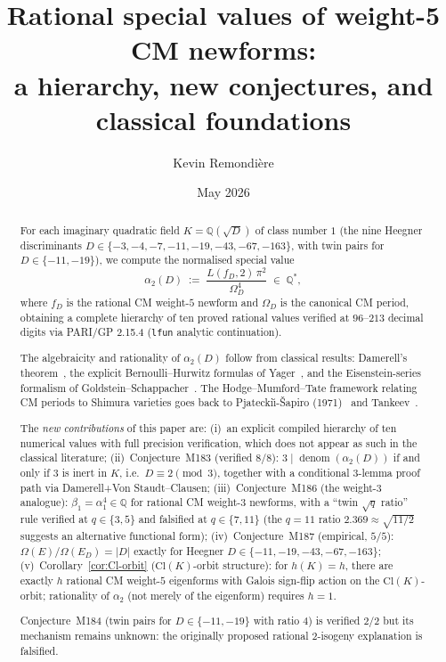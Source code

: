 \documentclass[12pt]{amsart}
\title{Rational special values of weight-5 CM newforms:\\
       a hierarchy, new conjectures, and classical foundations}
\author{Kevin Remondière}
\date{May 2026}
\theoremstyle{definition}
\DeclareMathOperator{\denom}{denom}
\newcommand{\Q}{\mathbb{Q}}
\newcommand{\Omega}{\varOmega}
\begin{document}
\begin{abstract}
For each imaginary quadratic field $K = \Q(\sqrt{D})$ of class number $1$
(the nine Heegner discriminants $D \in \{-3,-4,-7,-11,-19,-43,-67,-163\}$,
with twin pairs for $D \in \{-11,-19\}$),
we compute the normalised special value
\[
  \alpha_2(D) \;:=\; \frac{L(f_D,2)\,\pi^2}{\Omega_D^4} \;\in\; \Q^*,
\]
where $f_D$ is the rational CM weight-$5$ newform and $\Omega_D$ is the
canonical CM period, obtaining a complete hierarchy of ten proved rational
values verified at $96$--$213$ decimal digits via PARI/GP 2.15.4
(\texttt{lfun} analytic continuation).

The algebraicity and rationality of $\alpha_2(D)$ follow from classical results:
Damerell's theorem~\cite{Damerell1971}, the explicit Bernoulli--Hurwitz
formulas of Yager~\cite{Yager1982}, and the Eisenstein-series formalism of
Goldstein--Schappacher~\cite{GoldsteinSchappacher1981}.
The Hodge--Mumford--Tate framework relating CM periods to Shimura varieties
goes back to Pjatecki\u{\i}-\v{S}apiro (1971)~\cite{CITE-NEEDED-PS1971} and
Tankeev~\cite{CITE-NEEDED-Tankeev1990}.

The \emph{new contributions} of this paper are:
(i)~an explicit compiled hierarchy of ten numerical values with full precision
verification, which does not appear as such in the classical literature;
(ii)~Conjecture~M183 (verified $8/8$): $3 \mid \denom(\alpha_2(D))$
if and only if $3$ is inert in $K$, i.e.\ $D \equiv 2 \pmod{3}$,
together with a conditional 3-lemma proof path via Damerell+Von Staudt--Clausen;
(iii)~Conjecture~M186 (the weight-$3$ analogue): $\beta_1 = \alpha_1^4 \in \Q$
for rational CM weight-$3$ newforms, with a ``twin $\sqrt{q}$ ratio'' rule
verified at $q \in \{3,5\}$ and falsified at $q \in \{7, 11\}$
(the $q=11$ ratio $2.369 \approx \sqrt{11/2}$ suggests an alternative
functional form);
(iv)~Conjecture~M187 (empirical, $5/5$): $\Omega(E)/\Omega(E_D) = |D|$
exactly for Heegner $D \in \{-11,-19,-43,-67,-163\}$;
(v)~Corollary~\ref{cor:Cl-orbit} ($\mathrm{Cl}(K)$-orbit structure):
for $h(K) = h$, there are exactly $h$ rational CM weight-$5$ eigenforms
with Galois sign-flip action on the $\mathrm{Cl}(K)$-orbit;
rationality of $\alpha_2$ (not merely of the eigenform) requires $h=1$.

Conjecture~M184 (twin pairs for $D \in \{-11,-19\}$ with ratio $4$)
is verified $2/2$ but its mechanism remains unknown: the originally proposed
rational $2$-isogeny explanation is falsified.
\end{abstract}
\end{document}
